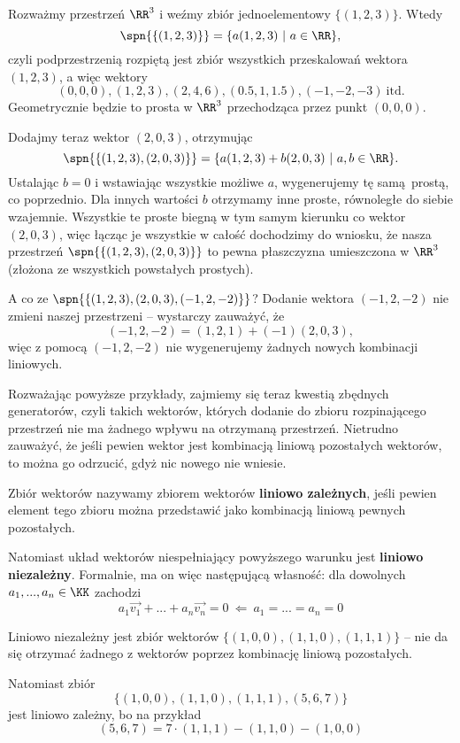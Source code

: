 \begin{example}
	Rozważmy przestrzeń $\RR^3$ i weźmy zbiór jednoelementowy $\{(1, 2, 3)\}$. Wtedy $$\spn{\{(1, 2, 3)\}} = \{a(1, 2, 3) \ | \ a \in \RR\},$$ czyli podprzestrzenią rozpiętą jest zbiór wszystkich przeskalowań wektora $(1, 2, 3)$, a więc wektory $$(0, 0, 0), (1, 2, 3), (2, 4, 6), (0.5, 1, 1.5), (-1, -2, -3) \ \text{itd.}$$ Geometrycznie będzie to prosta w $\RR^3$ przechodząca przez punkt $(0, 0, 0)$.
	
	Dodajmy teraz wektor $(2, 0, 3)$, otrzymując $$\spn{\{(1, 2, 3), (2, 0, 3)\}} = \{a(1, 2, 3) + b(2, 0, 3) \ | \ a, b \in \RR\}.$$ Ustalając $b = 0$ i wstawiając wszystkie możliwe $a$, wygenerujemy tę samą prostą, co poprzednio. Dla innych wartości $b$ otrzymamy inne proste, równoległe do siebie wzajemnie. Wszystkie te proste biegną w tym samym kierunku co wektor $(2, 0, 3)$, więc łącząc je wszystkie w całość dochodzimy do wniosku, że nasza przestrzeń $\spn{\{(1, 2, 3), (2, 0, 3)\}}$ to pewna płaszczyzna umieszczona w $\RR^3$ (złożona ze wszystkich powstałych prostych).
	
	A co ze $\spn{\{(1, 2, 3), (2, 0, 3), (-1, 2, -2)\}}$? Dodanie wektora $(-1, 2, -2)$ nie zmieni naszej przestrzeni -- wystarczy zauważyć, że $$(-1, 2, -2) = (1, 2, 1) + (-1)(2, 0, 3),$$ więc z pomocą $(-1, 2, -2)$ nie wygenerujemy żadnych nowych kombinacji liniowych.
\end{example}

Rozważając powyższe przykłady, zajmiemy się teraz kwestią zbędnych generatorów, czyli takich wektorów, których dodanie do zbioru rozpinającego przestrzeń nie ma żadnego wpływu na otrzymaną przestrzeń. Nietrudno zauważyć, że jeśli pewien wektor jest kombinacją liniową pozostałych wektorów, to można go odrzucić, gdyż nic nowego nie wniesie.

Zbiór wektorów nazywamy zbiorem wektorów \textbf{liniowo zależnych}, jeśli pewien element tego zbioru można przedstawić jako kombinacją liniową pewnych pozostałych.

Natomiast układ wektorów niespełniający powyższego warunku jest \textbf{liniowo niezależny}. Formalnie, ma on więc następującą własność: dla dowolnych $a_1, ..., a_n \in \KK$ zachodzi
$$a_1\vec{v_1} + ... + a_n\vec{v_n} = 0 \ \Leftarrow \ a_1 = ... = a_n = 0$$

\begin{example}
	Liniowo niezależny jest zbiór wektorów $\{(1, 0, 0), (1, 1, 0), (1, 1, 1)\}$ -- nie da się otrzymać żadnego z wektorów poprzez kombinację liniową pozostałych.
	
	Natomiast zbiór
	$$\{(1, 0, 0), (1, 1, 0), (1, 1, 1), (5, 6, 7)\}$$
	jest liniowo zależny, bo na przykład
	$$(5, 6, 7) = 7 \cdot (1, 1, 1) - (1, 1, 0) - (1, 0, 0)$$
\end{example}

